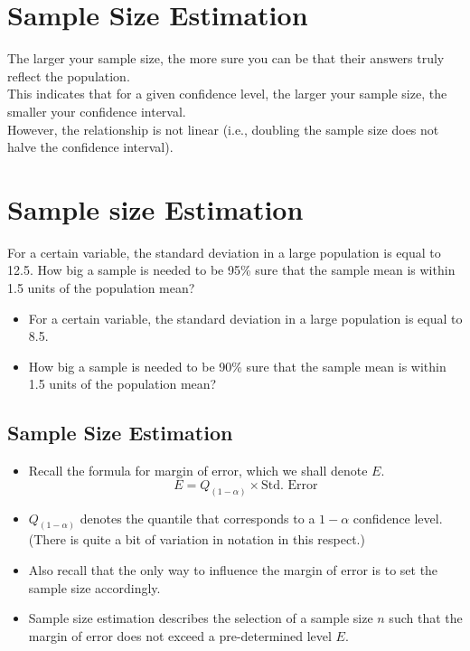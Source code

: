 \documentclass[]{report}
\begin{document}
\section{Sample Size Estimation}

The larger your sample size, the more sure you can be that their answers truly reflect the population.\\ This indicates that for a given confidence level, the larger your sample size, the smaller your confidence interval. \\However, the relationship is not linear (i.e., doubling the sample size does not halve the confidence interval).

\section{Sample size Estimation}
For a certain variable, the standard deviation in a large population is equal to 12.5.
How big a sample is needed to be 95\% sure that the sample mean is within 1.5 units of the population mean?


\begin{itemize}
\item For a certain variable, the standard deviation in a large population is equal to 8.5.
\item How big a sample is needed to be 90\% sure that the sample mean is within 1.5
units of the population mean?
\end{itemize}


\subsection{Sample Size Estimation}

\begin{itemize} \item Recall the formula for margin of error, which we shall denote $E$.
\[  E = Q_{(1-\alpha)} \times \mbox{Std. Error}\]

\item $Q_{(1-\alpha)}$ denotes the quantile that corresponds to a $1-\alpha$ confidence level. (There is quite a bit of variation in notation in this respect.)
\item Also recall that the only way to influence the margin of error is to set the sample size accordingly.

\item Sample size estimation describes the selection of a sample size $n$ such that the margin of error does not exceed a pre-determined level $E$.
\end{itemize}
\end{document}
